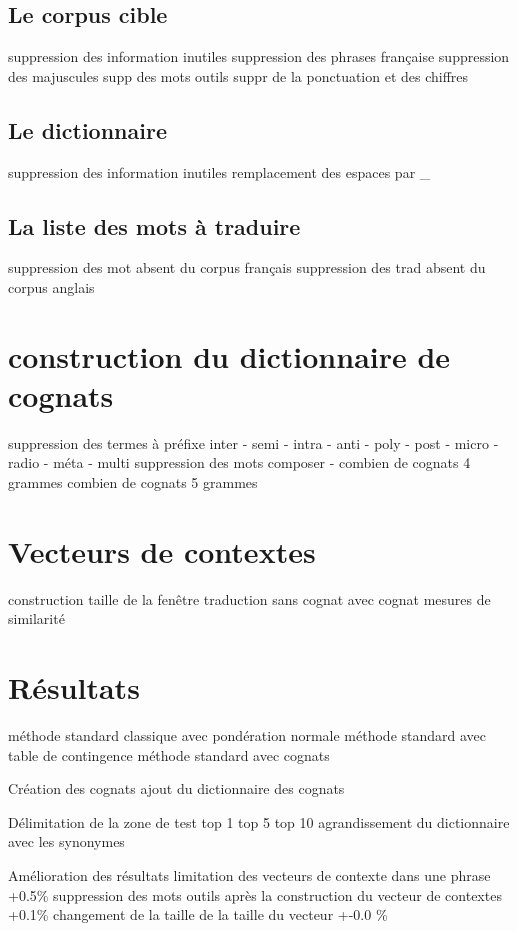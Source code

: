 	\subsection{Le corpus cible}
		suppression des information inutiles
		suppression des phrases française
		suppression des majuscules
		supp des mots outils
		suppr de la ponctuation et des chiffres
	\subsection{Le dictionnaire}
		suppression des information inutiles
		remplacement des espaces par \_
	\subsection{La liste des mots à traduire}
		suppression des mot absent du corpus français
		suppression des trad absent du corpus anglais

\section{construction du dictionnaire de cognats}
	suppression des termes à préfixe
		inter - semi - intra - anti - poly - post - micro - radio - méta - multi
	suppression des mots composer -
	combien de cognats 4 grammes
	combien de cognats 5 grammes

\section{Vecteurs de contextes}
	construction
		taille de la fenêtre
	traduction
		sans cognat
		avec cognat
	mesures de similarité

\section{Résultats}
	méthode standard classique avec pondération normale
	méthode standard avec table de contingence
	méthode standard avec cognats

Création des cognats
ajout du dictionnaire des cognats 


	Délimitation de la zone de test
	top 1
	top 5 
	top 10
	agrandissement du dictionnaire avec les synonymes

Amélioration des résultats
	limitation des vecteurs de contexte dans une phrase +0.5\%
	suppression des mots outils après la construction du vecteur de contextes +0.1\%
	changement de la taille de la taille du vecteur +-0.0 \%
	
